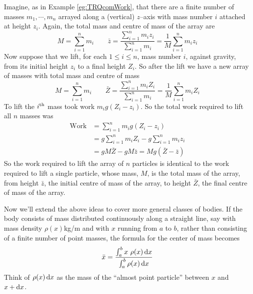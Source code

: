 \begin{eg}\label{eg:TRQcomWorkB}
Imagine, as in Example \ref{eg:TRQcomWork}, that there are a finite number of
masses $m_1,\cdots,m_n$ arrayed along a (vertical) $z$--axis with mass
number $i$ attached at height $z_i$. Again, the total mass and centre of
mass of the array are
\begin{equation*}
M=\sum_{i=1}^n m_i \qquad
\bar z =\frac{\sum_{i=1}^n m_iz_i}{\sum_{i=1}^n m_i}
       =\frac{1}{M} \sum_{i=1}^n m_iz_i
\end{equation*}
Now suppose that we lift, for each $1\le i\le n$, mass number $i$,
against gravity, from its initial height $z_i$ to a final height $Z_i$.
So after the lift we have a new array of masses with total mass and
centre of  mass
\begin{equation*}
M=\sum_{i=1}^n m_i \qquad
\bar Z =\frac{\sum_{i=1}^n m_iZ_i}{\sum_{i=1}^n m_i}
       =\frac{1}{M} \sum_{i=1}^n m_iZ_i
\end{equation*}
To lift the $i^{\rm th}$ mass took work $m_i g (Z_i-z_i)$. So the total
work required to lift all $n$ masses was
\begin{align*}
\text{Work} &= \sum_{i=1}^n  m_i g (Z_i-z_i) \\
            &= g  \sum_{i=1}^n  m_i Z_i  -g \sum_{i=1}^n  m_i z_i \\
            &= g M \bar Z - g M \bar z =Mg(\bar Z-\bar z)
\end{align*}
So the work required to lift the array of $n$ particles  is identical
to the work required to lift a single particle, whose mass, $M$, is
the total mass of the array, from height $\bar z$, the initial centre of mass
of the array, to height $\bar Z$, the final centre of mass of the array.
\end{eg}


Now we'll extend the above ideas to cover more general classes of bodies.
If the body consists of mass distributed continuously along a straight
line, say with mass density $\rho(x)$kg/m and with $x$ running from $a$ to
$b$, rather than consisting of a finite number of point masses,
the formula for the center of mass becomes
\begin{equation}\label{eq:TRQvariabledensityrod}
\bar x = \frac{\int_a^b x\ \rho(x)\,\mathrm{d}x}{\int_a^b \rho(x)\,\mathrm{d}x}
\end{equation}
Think of $\rho(x)\,\mathrm{d}x$ as the mass of the ``almost point particle''
between $x$ and $x+\mathrm{d}x$.

